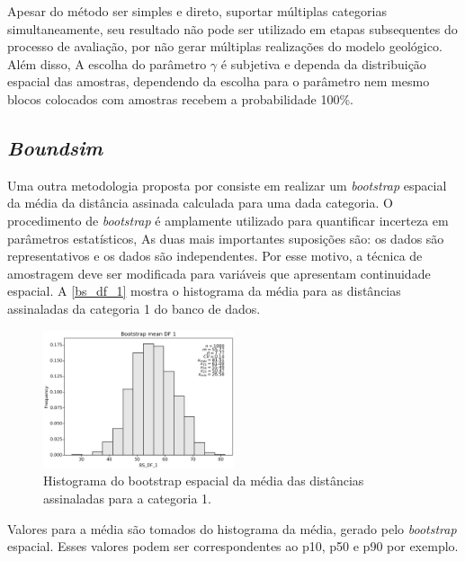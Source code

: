 Apesar do método ser simples e direto, suportar múltiplas categorias simultaneamente, seu resultado não pode ser utilizado em etapas subsequentes do processo de  avaliação, por não gerar múltiplas realizações do modelo geológico. Além disso, A escolha do parâmetro $\gamma$ é subjetiva e dependa da distribuição espacial das amostras, dependendo da escolha para o parâmetro nem mesmo blocos colocados com amostras recebem a probabilidade 100\%. 

\subsection{\textit{Boundsim}}

Uma outra metodologia proposta por  consiste em realizar um \textit{bootstrap} espacial \cite{deutsh_spatial_bootstrap} da média da distância assinada calculada para uma dada categoria. O procedimento de \textit{bootstrap} é amplamente utilizado para quantificar incerteza em parâmetros estatísticos, As duas mais importantes suposições são: os dados são representativos e os dados são independentes. Por esse motivo, a técnica de amostragem deve ser modificada para variáveis que apresentam continuidade espacial. A \autoref{bs_df_1} mostra o histograma da média para as distâncias assinaladas da categoria 1 do banco de dados. 

\begin{figure}[!ht]
	\caption{\label{bs_df_1}Histograma do bootstrap espacial da média das distâncias assinaladas para a categoria 1.}
	\begin{center}
		\includegraphics[width=0.5\textwidth]{capitulo_2/BS_DF_1.png}
	\end{center}
\end{figure}

Valores para a média são tomados do histograma da média, gerado pelo \textit{bootstrap} espacial. Esses valores podem ser correspondentes ao p10, p50 e p90 por exemplo.

